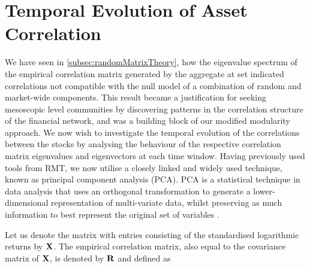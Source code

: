 \section{Temporal Evolution of Asset Correlation}
\label{sec:temporalEvolutionAssetCorrelation}

We have seen in \cref{subsec:randomMatrixTheory}, how the eigenvalue spectrum of the empirical correlation matrix generated by the aggregate at set indicated correlations not compatible with the null model of a combination of random and market-wide components.
This result became a justification for seeking mesoscopic level communities by discovering patterns in the correlation structure of the financial network, and was a building block of our modified modularity approach.
We now wish to investigate the temporal evolution of the correlations between the stocks by analysing the behaviour of the respective correlation matrix eigenvalues and eigenvectors at each time window.
Having previously used tools from RMT, we now utilise a closely linked \cite{FPW+11} and widely used technique, known as principal component analysis (PCA).
PCA is a statistical technique in data analysis that uses an orthogonal transformation to generate a lower-dimensional representation of multi-variate data, whilst preserving as much information to best represent the original set of variables \cite{Jol02,FPW+11}.

Let us denote the matrix with entries consisting of the standardised logarithmic returns by $\mathbf X$.
The empirical correlation matrix, also equal to the covariance matrix of $\mathbf X$, is denoted by $\mathbf R$ and defined as



